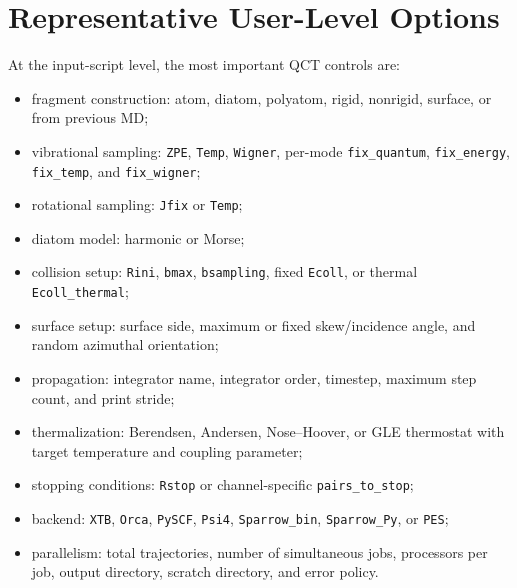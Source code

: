 \documentclass[11pt]{article}
\begin{document}
\section{Representative User-Level Options}

At the input-script level, the most important QCT controls are:
\begin{itemize}
  \item fragment construction: atom, diatom, polyatom, rigid, nonrigid, surface, or from previous MD;
  \item vibrational sampling: \texttt{ZPE}, \texttt{Temp}, \texttt{Wigner}, per-mode \texttt{fix\_quantum}, \texttt{fix\_energy}, \texttt{fix\_temp}, and \texttt{fix\_wigner};
  \item rotational sampling: \texttt{Jfix} or \texttt{Temp};
  \item diatom model: harmonic or Morse;
  \item collision setup: \texttt{Rini}, \texttt{bmax}, \texttt{bsampling}, fixed \texttt{Ecoll}, or thermal \texttt{Ecoll\_thermal};
  \item surface setup: surface side, maximum or fixed skew/incidence angle, and random azimuthal orientation;
  \item propagation: integrator name, integrator order, timestep, maximum step count, and print stride;
  \item thermalization: Berendsen, Andersen, Nose--Hoover, or GLE thermostat with target temperature and coupling parameter;
  \item stopping conditions: \texttt{Rstop} or channel-specific \texttt{pairs\_to\_stop};
  \item backend: \texttt{XTB}, \texttt{Orca}, \texttt{PySCF}, \texttt{Psi4}, \texttt{Sparrow\_bin}, \texttt{Sparrow\_Py}, or \texttt{PES};
  \item parallelism: total trajectories, number of simultaneous jobs, processors per job, output directory, scratch directory, and error policy.
\end{itemize}
\end{document}
